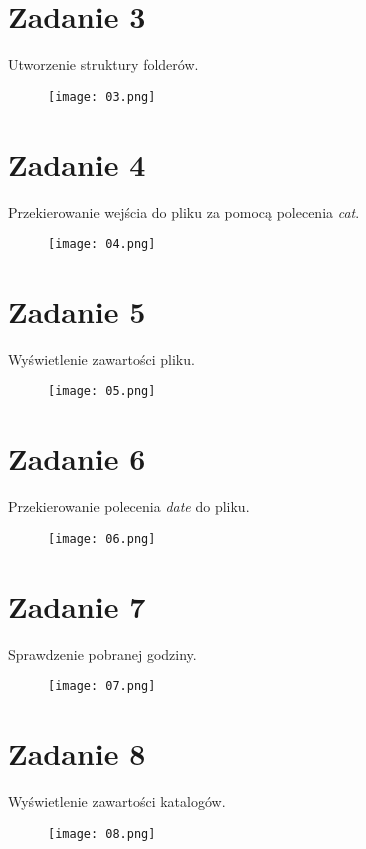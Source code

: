 \documentclass[fleqn,onecolumn,a4paper,12pt,titlepage]{article}
\begin{document}
\section*{Zadanie 3}
Utworzenie struktury folderów.
\begin{figure}[H]%
    \centering\texttt{[image: 03.png]}
\end{figure}

\section*{Zadanie 4}
Przekierowanie wejścia do pliku za pomocą polecenia \textit{cat}.
\begin{figure}[H]%
    \centering\texttt{[image: 04.png]}
\end{figure}

\section*{Zadanie 5}
Wyświetlenie zawartości pliku.
\begin{figure}[H]%
    \centering\texttt{[image: 05.png]}
\end{figure}

\section*{Zadanie 6}
Przekierowanie polecenia \textit{date} do pliku.
\begin{figure}[H]%
    \centering\texttt{[image: 06.png]}
\end{figure}

\section*{Zadanie 7}
Sprawdzenie pobranej godziny.
\begin{figure}[H]%
    \centering\texttt{[image: 07.png]}
\end{figure}

\section*{Zadanie 8}
Wyświetlenie zawartości katalogów.
\begin{figure}[H]%
    \centering\texttt{[image: 08.png]}
\end{figure}
\end{document}
